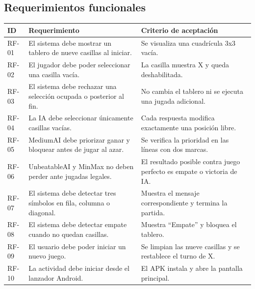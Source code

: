 \documentclass[stu,a4paper,12pt,floatsintext]{apa7}
\begin{document}
\subsection{Requerimientos funcionales}
\begin{longtable}{p{}p{}p{}}
\toprule
\textbf{ID} & \textbf{Requerimiento} & \textbf{Criterio de aceptación}\\
\midrule
RF-01 & El sistema debe mostrar un tablero de nueve casillas al iniciar.
 & Se visualiza una cuadrícula 3x3 vacía.\\
RF-02 & El jugador debe poder seleccionar una casilla vacía.
 & La casilla muestra X y queda deshabilitada.\\
RF-03 & El sistema debe rechazar una selección ocupada o posterior al fin.
 & No cambia el tablero ni se ejecuta una jugada adicional.\\
RF-04 & La IA debe seleccionar únicamente casillas vacías.
 & Cada respuesta modifica exactamente una posición libre.\\
RF-05 & MediumAI debe priorizar ganar y bloquear antes de jugar al azar.
 & Se verifica la prioridad en las líneas con dos marcas.\\
RF-06 & UnbeatableAI y MinMax no deben perder ante jugadas legales.
 & El resultado posible contra juego perfecto es empate o victoria de IA.\\
RF-07 & El sistema debe detectar tres símbolos en fila, columna o diagonal.
 & Muestra el mensaje correspondiente y termina la partida.\\
RF-08 & El sistema debe detectar empate cuando no quedan casillas.
 & Muestra ``Empate'' y bloquea el tablero.\\
RF-09 & El usuario debe poder iniciar un nuevo juego.
 & Se limpian las nueve casillas y se restablece el turno de X.\\
RF-10 & La actividad debe iniciar desde el lanzador Android.
 & El APK instala y abre la pantalla principal.\\
\bottomrule
\end{longtable}
\end{document}
